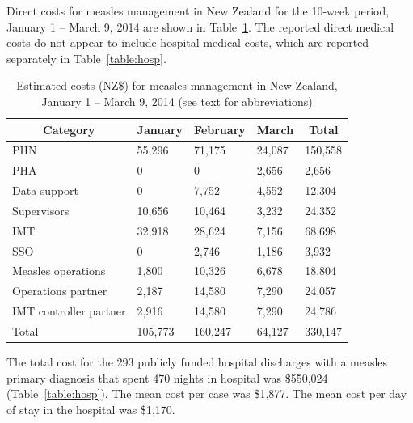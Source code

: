 \documentclass{article}
\begin{document}
Direct costs for measles management in New Zealand for the 10-week period, January 1 -- March 9, 2014 are shown in  Table~\ref{table:direct}. The reported direct medical costs do not appear to include hospital medical costs, which are reported separately in Table~\ref{table:hosp}. 


\begin{table}
\caption{Estimated costs (NZ\$) for measles management in New Zealand, January 1 -- March 9, 2014 (see text for abbreviations)}
\begin{center}
\begin{tabular}{lllll}
\hline\hline
\multicolumn{1}{c}{Category}&\multicolumn{1}{c}{January}&\multicolumn{1}{c}{February}&\multicolumn{1}{c}{March}&\multicolumn{1}{c}{Total}\tabularnewline
\hline
PHN&55,296&71,175&24,087&150,558\tabularnewline
PHA&0&0&2,656&2,656\tabularnewline
Data support&0&7,752&4,552&12,304\tabularnewline
Supervisors&10,656&10,464&3,232&24,352\tabularnewline
IMT&32,918&28,624&7,156&68,698\tabularnewline
SSO&0&2,746&1,186&3,932\tabularnewline
Measles operations&1,800&10,326&6,678&18,804\tabularnewline
Operations partner&2,187&14,580&7,290&24,057\tabularnewline
IMT controller partner&2,916&14,580&7,290&24,786\tabularnewline
Total&105,773&160,247&64,127&330,147\tabularnewline
\hline
\end{tabular}\end{center}\label{table:direct}
\end{table}

The total cost for the 293 publicly funded hospital discharges with a measles primary diagnosis that spent 470 nights in hospital was \$550,024 (Table~\ref{table:hosp}). The mean cost per case was \$1,877. The mean cost per day of stay in the hospital was \$1,170.
\end{document}
